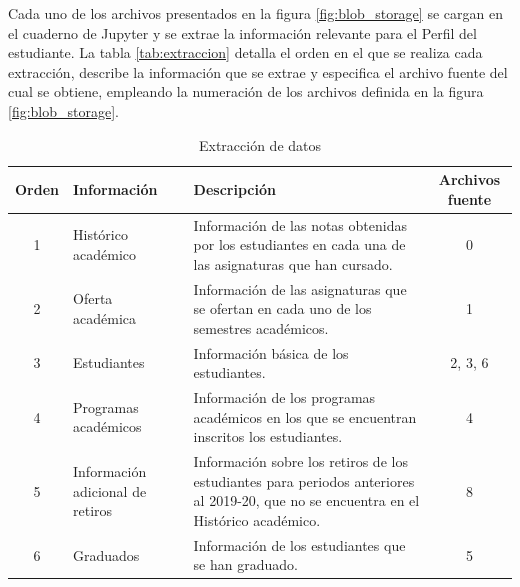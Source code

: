 Cada uno de los archivos presentados en la figura \ref{fig:blob_storage} se cargan en el cuaderno de Jupyter y 
se extrae la información relevante para el Perfil del estudiante. La tabla \ref{tab:extraccion} detalla el orden en el que se realiza cada extracción, describe la información que se extrae y especifica el archivo fuente del cual se obtiene, empleando la numeración de los archivos definida en la figura \ref{fig:blob_storage}.

\begin{table}[h]
	\centering
	\caption{Extracción de datos}
	\alternatecolors
	\begin{tabular}{cp{2.3cm}p{7cm}c}
		\hline
		\textbf{Orden} & \textbf{Información}                               & \textbf{Descripción}                                                                                                                 & \textbf{Archivos fuente} \\
		\hline
		1              & Histórico académico                                & Información de las notas obtenidas por los estudiantes en cada una de las asignaturas que han cursado.                               & 0                        \\
		2              & Oferta \newline académica                          & Información de las asignaturas que se ofertan en cada uno de los semestres académicos.                                               & 1                        \\
		3              & Estudiantes                                        & Información básica de los estudiantes.                                                                                               & 2, 3, 6                  \\
		4              & Programas académicos                               & Información de los programas académicos en los que se encuentran inscritos los estudiantes.                                          & 4                        \\
		5              & Información \newline adicional \newline de retiros & Información sobre los retiros de los estudiantes para periodos anteriores al 2019-20, que no se encuentra en el Histórico académico. & 8                        \\
		6              & Graduados                                          & Información de los estudiantes que se han graduado.                                                                                  & 5                        \\

\end{tabular}
\end{table}
